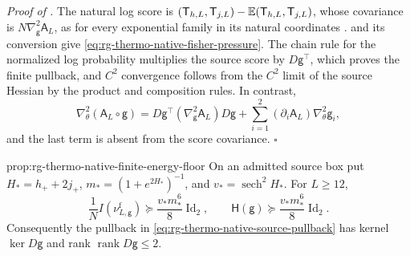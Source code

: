 \noindent\emph{Proof of .}
The natural log score is
$(\mathsf T_{h,L},\mathsf T_{j,L})-\mathbb E(\mathsf T_{h,L},\mathsf T_{j,L})$, whose
covariance is $N\nabla_{\mathsf g}^2\mathsf A_L$, as for every exponential
family in its natural coordinates \citep[Ch.~3]{AmariNagaoka2000}.
 and its conversion give
\cref{eq:rg-thermo-native-fisher-pressure}. The chain rule for the normalized
log probability multiplies the source score by $D\mathsf g^\top$, which proves the
finite pullback, and $C^2$ convergence follows from the $C^2$ limit of the
source Hessian by the product and composition rules. In contrast,
\begin{equation}
 \nabla_\theta^2(\mathsf A_L\circ\mathsf g)
 =D\mathsf g^\top(\nabla_{\mathsf g}^2\mathsf A_L)D\mathsf g
   +\sum_{i=1}^2(\partial_i\mathsf A_L)\nabla_\theta^2\mathsf g_i,
 \label{eq:rg-thermo-native-nonnatural-hessian}
\end{equation}
and the last term is absent from the score covariance. $\square$

{prop:rg-thermo-native-finite-energy-floor}
On an admitted source box put $H_*=h_++2j_+$, $m_*=(1+e^{2H_*})^{-1}$, and
$v_*=\operatorname{sech}^2H_*$. For $L\ge12$,
\begin{equation}
 \frac1N I(\nu^{\mathrm f}_{L,\mathsf g})\succeq
       \frac{v_*m_*^6}{8}\operatorname{Id}_2,
 \qquad \mathsf H(\mathsf g)\succeq\frac{v_*m_*^6}{8}\operatorname{Id}_2.
 \label{eq:rg-thermo-native-compact-floor}
\end{equation}
Consequently the pullback in \cref{eq:rg-thermo-native-source-pullback} has
kernel $\ker D\mathsf g$ and rank $\operatorname{rank}D\mathsf g\le2$.

